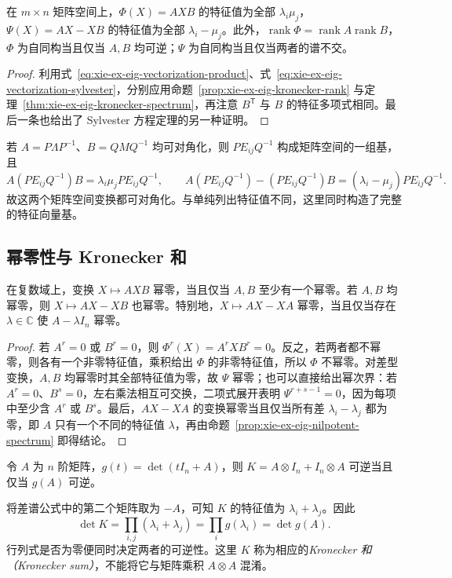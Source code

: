 \begin{proposition}
\label{prop:xie-ex-eig-matrix-space-spectrum}
在 $m\times n$ 矩阵空间上，$\Phi(X)=AXB$ 的特征值为全部 $\lambda_i\mu_j$，$\Psi(X)=AX-XB$ 的特征值为全部 $\lambda_i-\mu_j$。此外，$\operatorname{rank}\Phi=\operatorname{rank}A\operatorname{rank}B$，$\Phi$ 为自同构当且仅当 $A,B$ 均可逆；$\Psi$ 为自同构当且仅当两者的谱不交。
\end{proposition}
\begin{proof}
利用式~\eqref{eq:xie-ex-eig-vectorization-product}、式~\eqref{eq:xie-ex-eig-vectorization-sylvester}，分别应用命题~\ref{prop:xie-ex-eig-kronecker-rank} 与定理~\ref{thm:xie-ex-eig-kronecker-spectrum}，再注意 $B^{\mathsf T}$ 与 $B$ 的特征多项式相同。最后一条也给出了 Sylvester 方程定理的另一种证明。
\end{proof}

若 $A=P\Lambda P^{-1}$、$B=QMQ^{-1}$ 均可对角化，则 $PE_{ij}Q^{-1}$ 构成矩阵空间的一组基，且
\[
A(PE_{ij}Q^{-1})B=\lambda_i\mu_jPE_{ij}Q^{-1},\qquad
A(PE_{ij}Q^{-1})-(PE_{ij}Q^{-1})B
=(\lambda_i-\mu_j)PE_{ij}Q^{-1}.
\]
故这两个矩阵空间变换都可对角化。与单纯列出特征值不同，这里同时构造了完整的特征向量基。

\subsection{幂零性与 Kronecker 和}

\begin{proposition}
在复数域上，变换 $X\mapsto AXB$ 幂零，当且仅当 $A,B$ 至少有一个幂零。若 $A,B$ 均幂零，则 $X\mapsto AX-XB$ 也幂零。特别地，$X\mapsto AX-XA$ 幂零，当且仅当存在 $\lambda\in\mathbb C$ 使 $A-\lambda I_n$ 幂零。
\end{proposition}
\begin{proof}
若 $A^r=0$ 或 $B^r=0$，则 $\Phi^r(X)=A^rXB^r=0$。反之，若两者都不幂零，则各有一个非零特征值，乘积给出 $\Phi$ 的非零特征值，所以 $\Phi$ 不幂零。对差型变换，$A,B$ 均幂零时其全部特征值为零，故 $\Psi$ 幂零；也可以直接给出幂次界：若 $A^r=0$、$B^s=0$，左右乘法相互可交换，二项式展开表明 $\Psi^{r+s-1}=0$，因为每项中至少含 $A^r$ 或 $B^s$。最后，$AX-XA$ 的变换幂零当且仅当所有差 $\lambda_i-\lambda_j$ 都为零，即 $A$ 只有一个不同的特征值 $\lambda$，再由命题~\ref{prop:xie-ex-eig-nilpotent-spectrum} 即得结论。
\end{proof}

\begin{example}
令 $A$ 为 $n$ 阶矩阵，$g(t)=\det(tI_n+A)$，则 $K=A\otimes I_n+I_n\otimes A$ 可逆当且仅当 $g(A)$ 可逆。
\end{example}
\begin{solve}
将差谱公式中的第二个矩阵取为 $-A$，可知 $K$ 的特征值为 $\lambda_i+\lambda_j$。因此
\[
\det K=\prod_{i,j}(\lambda_i+\lambda_j)
=\prod_i g(\lambda_i)=\det g(A).
\]
行列式是否为零便同时决定两者的可逆性。这里 $K$ 称为相应的\emph{Kronecker 和（Kronecker sum）}，不能将它与矩阵乘积 $A\otimes A$ 混淆。
\end{solve}

